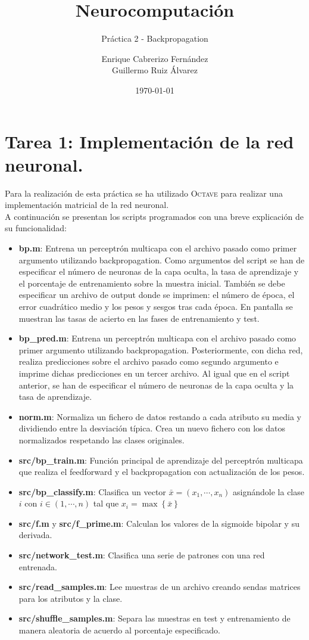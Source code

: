\documentclass[spanish]{assignment}
\title{Neurocomputación}
\subtitle{Práctica 2 - Backpropagation}
\author{Enrique Cabrerizo Fernández\\ Guillermo Ruiz Álvarez}
\date{\today}
\begin{document}
	\makepre
	\section{Tarea 1: Implementación de la red neuronal.}
	Para la realización de esta práctica se ha utilizado \textsc{Octave} para realizar una implementación matricial de la red neuronal.\\
	A continuación se presentan los scripts programados con una breve explicación de su funcionalidad:
	\begin{itemize}
		\item \textbf{bp.m}: Entrena un perceptrón multicapa con el archivo pasado como primer argumento utilizando backpropagation. Como argumentos del script se han de especificar el número de neuronas de la capa oculta, la tasa de aprendizaje y el porcentaje de entrenamiento sobre la muestra inicial. También se debe especificar un archivo de output donde se imprimen: el número de época, el error cuadrático medio y los pesos y sesgos tras cada época. En pantalla se muestran las tasas de acierto en las fases de entrenamiento y test.
		\item \textbf{bp\_pred.m}: Entrena un perceptrón multicapa con el archivo pasado como primer argumento utilizando backpropagation. Posteriormente, con dicha red, realiza predicciones sobre el archivo pasado como segundo argumento e imprime dichas predicciones en un tercer archivo. Al igual que en el script anterior, se han de especificar el número de neuronas de la capa oculta y la tasa de aprendizaje.
		\item \textbf{norm.m}: Normaliza un fichero de datos restando a cada atributo su media y dividiendo entre la desviación típica. Crea un nuevo fichero con los datos normalizados respetando las clases originales.
		\item \textbf{src/bp\_train.m}: Función principal de aprendizaje del perceptrón multicapa que realiza el feedforward y el backpropagation con actualización de los pesos.
		\item \textbf{src/bp\_classify.m}: Clasifica un vector $\bar{x}=(x_1,\cdots,x_n)$ asignándole la clase $i$ con $i \in (1,\cdots,n)$ tal que $x_i = \max\left\{\bar{x}\right\}$
		\item \textbf{src/f.m} y \textbf{src/f\_prime.m}: Calculan los valores de la sigmoide bipolar y su derivada.
		\item \textbf{src/network\_test.m}: Clasifica una serie de patrones con una red entrenada.
		\item \textbf{src/read\_samples.m}: Lee muestras de un archivo creando sendas matrices para los atributos y la clase. 
		\item \textbf{src/shuffle\_samples.m}: Separa las muestras en test y entrenamiento de manera aleatoria de acuerdo al porcentaje especificado.
	\end{itemize}
\end{document}
